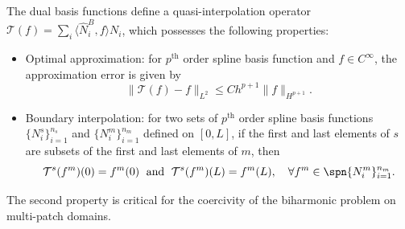\begin{remark}
    The \Bezier dual basis functions define a quasi-interpolation operator $\mathcal{T}(f)=\sum_i \langle\hat{N}^B_i,f\rangle N_i$, which possesses the following properties:
    \begin{itemize}
        \item Optimal approximation: for $p^\text{th}$ order spline basis function and $f\in C^\infty$, the approximation error is given by~\cite{thomas_bezier_2015}
              \begin{equation}
                  \|\mathcal{T}(f)-f\|_{L^2}\leq Ch^{p+1}\|f\|_{H^{p+1}}.
              \end{equation}
        \item Boundary interpolation: for two sets of $p^\text{th}$ order spline basis functions $\{{N^s_i}\}_{i=1}^{n_s}$ and $\{{N^m_i}\}_{i=1}^{n_m}$ defined on $\left[{0,L}\right]$, if the first and last elements of $s$ are subsets of the first and last elements of $m$, then
              \begin{equation}
                  \mathcal{T}^s(f^m)(0)=f^m(0)\;\text{ and }\;\mathcal{T}^s(f^m)(L)=f^m(L),\quad\forall f^m\in\spn\{{N^m_i}\}_{i=1}^{n_m}.\label{eq:boundary_interpolation}
              \end{equation}
    \end{itemize}
    The second property is critical for the coercivity of the biharmonic problem on multi-patch domains.
\end{remark}